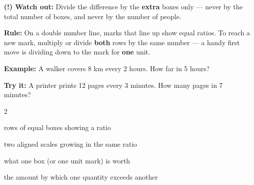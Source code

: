 \documentclass[12pt]{article}
\begin{document}
\begin{watchoutbox}
\textbf{(!) Watch out:} Divide the difference by the \textbf{extra} boxes only
— never by the total number of boxes, and never by the number of people.
\end{watchoutbox}


\begin{formulabox}
\textbf{Rule:} On a double number line, marks that line up show equal ratios.
To reach a new mark, multiply or divide \textbf{both} rows by the same number
— a handy first move is dividing down to the mark for \textbf{one} unit.
\end{formulabox}

\begin{examplebox}
\textbf{Example:} \quad A walker covers 8 km every 2 hours. How far in 5 hours?
\end{examplebox}

\begin{tryitbox}
\textbf{Try it:} \quad A printer prints 12 pages every 3 minutes. How many pages
in 7 minutes?\\[2pt]
\end{tryitbox}

\vspace{0.3cm}

\begin{multicols}{2}
\begin{description}[leftmargin=0.5cm, itemsep=2pt, font=\normalfont\bfseries]
  \item[Tape diagram:] rows of equal boxes showing a ratio
  \item[Double number line:] two aligned scales growing in the same ratio
  \item[Unit value:] what one box (or one unit mark) is worth
  \item[Difference:] the amount by which one quantity exceeds another
\end{description}
\end{multicols}
\end{document}
